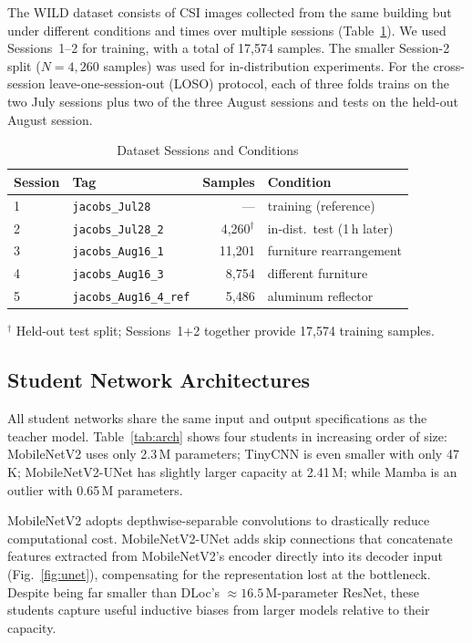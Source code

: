 \documentclass[conference]{IEEEtran}
\begin{document}
The WILD dataset consists of CSI images collected from the same building but under different conditions and times over multiple sessions (Table~\ref{tab:sessions}). We used Sessions~1--2 for training, with a total of 17{,}574 samples. The smaller Session-2 split ($N = 4{,}260$ samples) was used for in-distribution experiments. For the cross-session leave-one-session-out (LOSO) protocol, each of three folds trains on the two July sessions plus two of the three August sessions and tests on the held-out August session.

\begin{table}[t]
\caption{Dataset Sessions and Conditions}
\label{tab:sessions}
\centering
\footnotesize
\setlength{\tabcolsep}{4pt}
\begin{tabular}{@{}llrl@{}}
\toprule
\textbf{Session} & \textbf{Tag} & \textbf{Samples} & \textbf{Condition} \\
\midrule
1 & \texttt{jacobs\_Jul28}        & ---     & training (reference) \\
2 & \texttt{jacobs\_Jul28\_2}     & 4{,}260$^\dagger$ & in-dist.\ test (1\,h later) \\
3 & \texttt{jacobs\_Aug16\_1}     & 11{,}201 & furniture rearrangement \\
4 & \texttt{jacobs\_Aug16\_3}     & 8{,}754  & different furniture \\
5 & \texttt{jacobs\_Aug16\_4\_ref}& 5{,}486  & aluminum reflector \\
\bottomrule
\end{tabular}

\vspace{0.3em}
{\footnotesize $^\dagger$ Held-out test split; Sessions~1+2 together provide 17{,}574 training samples.}
\end{table}

\subsection{Student Network Architectures}
All student networks share the same input and output specifications as the teacher model. Table~\ref{tab:arch} shows four students in increasing order of size: MobileNetV2 uses only 2.3\,M parameters; TinyCNN is even smaller with only 47\,K; MobileNetV2-UNet has slightly larger capacity at 2.41\,M; while Mamba is an outlier with 0.65\,M parameters.

MobileNetV2 adopts depthwise-separable convolutions to drastically reduce computational cost. MobileNetV2-UNet adds skip connections that concatenate features extracted from MobileNetV2's encoder directly into its decoder input (Fig.~\ref{fig:unet}), compensating for the representation lost at the bottleneck. Despite being far smaller than DLoc's ${\approx}16.5$\,M-parameter ResNet, these students capture useful inductive biases from larger models relative to their capacity.
\end{document}

